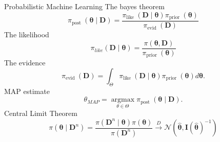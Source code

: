 \begin{frame}{Probabilistic Machine Learning}
\footnotesize
The bayes theorem
\begin{equation}
\pi_{\text {post }}(\boldsymbol{\theta} \mid \mathbf{D})=\frac{\pi_{\text {like }}(\mathbf{D} \mid \boldsymbol{\theta}) \pi_{\text {prior }}(\boldsymbol{\theta})}{\pi_{\text {evid }}(\mathbf{D})}
\end{equation}
The likelihood
\begin{equation}
\pi_{l i k e}(\mathbf{D} \mid \boldsymbol{\theta})=\frac{\pi(\boldsymbol{\theta}, \mathbf{D})}{\pi_{\text {prior }}(\boldsymbol{\theta})}
\end{equation}
The evidence
\begin{equation}
\pi_{\text {evid }}(\mathbf{D})=\int_{\Theta} \pi_{\text {like }}(\mathbf{D} \mid \boldsymbol{\theta}) \pi_{\text {prior }}(\boldsymbol{\theta}) d \boldsymbol{\theta} .
\end{equation}
MAP estimate
\begin{equation}
\theta_{M A P}=\underset{\theta \in \Theta}{\operatorname{argmax}} \pi_{\text {post }}(\boldsymbol{\theta} \mid \mathbf{D}) .
\end{equation}
Central Limit Theorem
\begin{equation}
\pi\left(\boldsymbol{\theta} \mid \mathbf{D}^n\right)=\frac{\pi\left(\mathbf{D}^n \mid \boldsymbol{\theta}\right) \pi(\boldsymbol{\theta})}{\pi\left(\mathbf{D}^n\right)} \stackrel{D}{\rightarrow} \mathcal{N}\left(\hat{\boldsymbol{\theta}}, \mathbf{I}(\hat{\boldsymbol{\theta}})^{-1}\right)
\end{equation}
\end{frame}